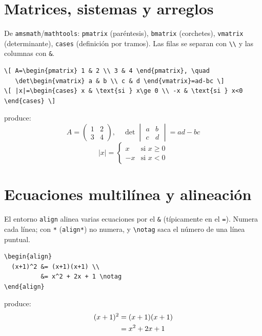 \documentclass[11pt,a4paper]{article}
\newcommand{\C}[1]{\texttt{\textbackslash #1}}   %
\theoremstyle{plain}      %
\theoremstyle{definition} %
\theoremstyle{remark}
\begin{document}
\section{Matrices, sistemas y arreglos}
De \texttt{amsmath}/\texttt{mathtools}: \texttt{pmatrix} (paréntesis),
\texttt{bmatrix} (corchetes), \texttt{vmatrix} (determinante), \texttt{cases}
(definición por tramos). Las filas se separan con \verb|\\| y las columnas
con \verb|&|.
\begin{lstlisting}
\[ A=\begin{pmatrix} 1 & 2 \\ 3 & 4 \end{pmatrix}, \quad
   \det\begin{vmatrix} a & b \\ c & d \end{vmatrix}=ad-bc \]
\[ |x|=\begin{cases} x & \text{si } x\ge 0 \\ -x & \text{si } x<0 \end{cases} \]
\end{lstlisting}
produce:
\[ A=\begin{pmatrix} 1 & 2 \\ 3 & 4 \end{pmatrix}, \quad
   \det\begin{vmatrix} a & b \\ c & d \end{vmatrix}=ad-bc \]
\[ |x|=\begin{cases} x & \text{si } x\ge 0 \\ -x & \text{si } x<0 \end{cases} \]

\section{Ecuaciones multilínea y alineación}
El entorno \texttt{align} alinea varias ecuaciones por el \verb|&| (típicamente
en el \verb|=|). Numera cada línea; con \verb|*| (\texttt{align*}) no numera, y
\C{notag} saca el número de una línea puntual.
\begin{lstlisting}
\begin{align}
  (x+1)^2 &= (x+1)(x+1) \\
          &= x^2 + 2x + 1 \notag
\end{align}
\end{lstlisting}
produce:
\begin{align}
  (x+1)^2 &= (x+1)(x+1) \\
          &= x^2 + 2x + 1 \notag
\end{align}
\end{document}

